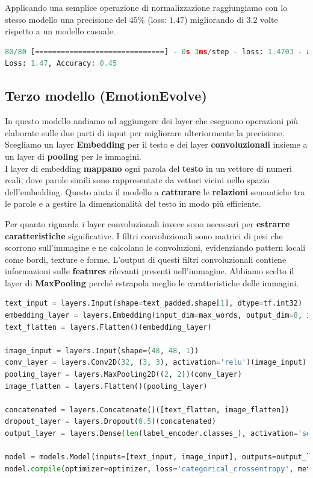 \documentclass{article}
\begin{document}
Applicando una semplice operazione di normalizzazione raggiungiamo con lo stesso modello una precisione del $45\%$ (loss: $1.47$) migliorando di $3.2$ volte rispetto a un modello casuale.
\begin{lstlisting}[language=Python, caption=Risultati modello normalizzato]
80/80 [==============================] - 0s 3ms/step - loss: 1.4703 - accuracy: 0.4498
Loss: 1.47, Accuracy: 0.45
\end{lstlisting}

\subsection{Terzo modello (EmotionEvolve)}

In questo modello andiamo ad aggiungere dei layer che eseguono operazioni più elaborate sulle due parti di input per migliorare ulteriormente la precisione. Scegliamo un layer \textbf{Embedding} per il testo e dei layer \textbf{convoluzionali} insieme a un layer di \textbf{pooling} per le immagini.\\

I layer di embedding \textbf{mappano} ogni parola del \textbf{testo} in un vettore di numeri reali, dove parole simili sono rappresentate da vettori vicini nello spazio dell'embedding. Questo aiuta il modello a \textbf{catturare} le \textbf{relazioni} semantiche tra le parole e a gestire la dimensionalità del testo in modo più efficiente. 

\bigskip

Per quanto riguarda i layer convoluzionali invece sono necessari per \textbf{estrarre} \textbf{caratteristiche} significative. I filtri convoluzionali sono matrici di pesi che scorrono sull'immagine e ne calcolano le convoluzioni, evidenziando pattern locali come bordi, texture e forme. L'output di questi filtri convoluzionali contiene informazioni sulle \textbf{features} rilevanti presenti nell'immagine. Abbiamo scelto il layer di \textbf{MaxPooling} perché estrapola meglio le caratteristiche delle immagini.
\\
\begin{lstlisting}[language=Python, caption=modello con layer embedding e convoluzionali]
text_input = layers.Input(shape=text_padded.shape[1], dtype=tf.int32)
embedding_layer = layers.Embedding(input_dim=max_words, output_dim=8, input_length=text_padded.shape[1])(text_input)
text_flatten = layers.Flatten()(embedding_layer)

image_input = layers.Input(shape=(48, 48, 1))
conv_layer = layers.Conv2D(32, (3, 3), activation='relu')(image_input)
pooling_layer = layers.MaxPooling2D((2, 2))(conv_layer)
image_flatten = layers.Flatten()(pooling_layer)

concatenated = layers.Concatenate()([text_flatten, image_flatten])
dropout_layer = layers.Dropout(0.5)(concatenated)
output_layer = layers.Dense(len(label_encoder.classes_), activation='softmax')(dropout_layer)

model = models.Model(inputs=[text_input, image_input], outputs=output_layer)
model.compile(optimizer=optimizer, loss='categorical_crossentropy', metrics=['accuracy'])
\end{lstlisting}
\end{document}
